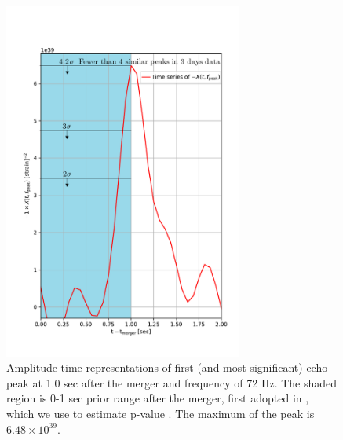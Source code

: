 \documentclass[12pt]{article}
\begin{document}
\begin{figure}[!tbp]
\centering
    \includegraphics[width=0.7\textwidth]{peak_in_short_time.pdf}
 \caption{Amplitude-time representations of first (and most significant) echo peak at 1.0 sec after the merger and frequency of 72 Hz. The shaded region is 0-1 sec prior range after the merger, first adopted in \cite{Abbott:2017dke}, which we use to estimate p-value . The maximum of the peak is $6.48\times10^{39}$.}
 \label{NS-NS_9}
\end{figure}
\end{document}
